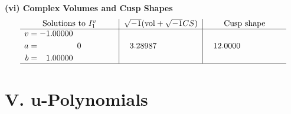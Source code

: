 \documentclass[1p]{elsarticle_modified}
\theoremstyle{definition}
\newcommand{\I}{\sqrt{-1}}
\begin{document}
\newpage\flushleft \textbf{(vi) Complex Volumes and Cusp Shapes}
$$\begin{array}{c|c|c}  
\text{Solutions to }I^v_{1}& \I (\text{vol} + \sqrt{-1}CS) & \text{Cusp shape}\\
 \hline 
\begin{aligned}
v &= -1.00000\phantom{ +0.000000I} \\
a &= \phantom{-0.000000 } 0 \\
b &= \phantom{-}1.00000\phantom{ +0.000000I}\end{aligned}
 & \phantom{-}3.28987\phantom{ +0.000000I} & \phantom{-}12.0000\phantom{ +0.000000I}\\
 \hline 
 \end{array}$$\newpage
\newpage\renewcommand{\arraystretch}{1}
\centering \section*{ V. u-Polynomials}
\end{document}
